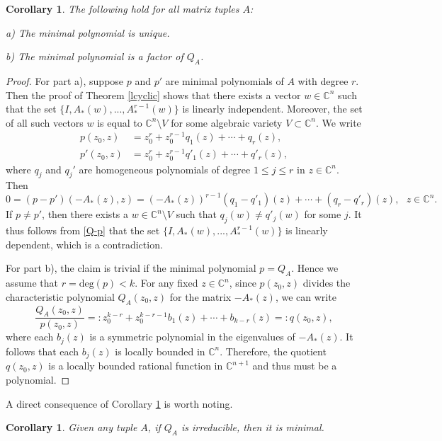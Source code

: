 \documentclass[draft, 12pt, reqno]{amsart}
\newcommand{\C}{{\mathbb C}}
\numberwithin{equation}{section}
\theoremstyle{plain}
\newtheorem{corollary}[theorem]{Corollary}
\begin{document}
\begin{corollary}\label{properties}
The following hold for all matrix tuples $A$:

a) The minimal polynomial is unique.

b) The minimal polynomial is a factor of $Q_A$.
\end{corollary}
\begin{proof}

For part a), suppose $p$ and $p'$ are minimal polynomials of $A$ with degree $r$. Then the proof of Theorem \ref{lcyclic} shows that there exists a vector $w\in \C^n$ such that the set $\{I, A_*(w), ..., A^{r-1}_*(w)\}$ is linearly independent. Moreover, the set of all such vectors $w$ is equal to $\C^n\setminus V$ for some algebraic variety $V\subset \C^n$. We write
\begin{align*}
  p(z_0,z)&=z_0^r+z_0^{r-1}q_1(z)+\cdots +q_{r}(z),\\
  p'(z_0,z)&=z_0^r+z_0^{r-1}q'_1(z)+\cdots +q'_{r}(z),
  \end{align*} 
where $q_j$ and $q_j'$ are homogeneous polynomials of degree $1\leq j\leq r$ in $z\in \C^n$. Then 
\begin{equation}\label{Q-p}
0=(p-p')(-A_*(z),z)=(-A_*(z))^{r-1}(q_1-q'_1)(z)+\cdots +(q_r-q'_r)(z),\ \ \ z\in \C^n.
\end{equation}
If $p\neq p'$, then there exists a $w\in \C^n\setminus V$ such that $q_j(w)\neq q'_j(w)$ for some $j$. It thus follows from \eqref{Q-p} that the set $\{I, A_*(w), ..., A^{r-1}_*(w)\}$ is linearly dependent, which is a contradiction.

For part b), the claim is trivial if the minimal polynomial $p=Q_A$. Hence we assume that $r=\text{deg}(p)<k$. For any fixed $z\in \C^n$, since $p(z_0,z)$ divides the characteristic polynomial $Q_A(z_0,z)$ for the matrix $-A_*(z)$, we can write 
\[\frac{Q_A(z_0,z)}{p(z_0,z)}=: z_0^{k-r}+z_0^{k-r-1}b_1(z)+\cdots +b_{k-r}(z)=:q(z_0,z),\]
where each $b_j(z)$ is a symmetric polynomial in the eigenvalues of $-A_*(z)$. It follows that each $b_j(z)$ is locally bounded in $\C^n$. Therefore, the quotient $q(z_0,z)$ is a locally bounded rational function in $\C^{n+1}$ and thus must be a polynomial.
\end{proof}

A direct consequence of Corollary \ref{properties} is worth noting.
\begin{corollary}\label{admi1}
Given any tuple $A$, if $Q_A$ is irreducible, then it is minimal.
\end{corollary}
\end{document}
